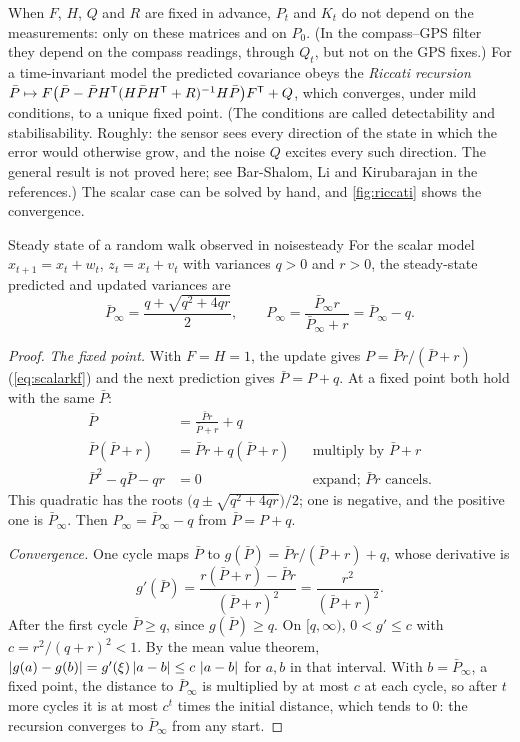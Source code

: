 When $F$, $H$, $Q$ and $R$ are fixed in advance, $P_t$ and $K_t$ do not
depend on the measurements: only on these matrices and on $P_0$. (In the
compass--GPS filter they depend on the compass readings, through $Q_t$,
but not on the GPS fixes.) For a time-invariant model the predicted covariance obeys the
\emph{Riccati recursion} $\bar P\mapsto F\bigl(\bar P-\bar PH^{\mathsf{T}}(H\bar PH^{\mathsf{T}}
+R)^{-1}H\bar P\bigr)F^{\mathsf{T}}+Q$, which converges, under mild conditions, to a
unique fixed point. (The conditions are called detectability and
stabilisability. Roughly: the sensor sees every direction of the state in
which the error would otherwise grow, and the noise $Q$ excites every such
direction. The general result is not proved here; see Bar-Shalom, Li and
Kirubarajan in the references.) The scalar case can be solved by hand, and
\cref{fig:riccati} shows the convergence.

\begin{proposition}{Steady state of a random walk observed in noise}{steady}
For the scalar model $x_{t+1}=x_t+w_t$, $z_t=x_t+v_t$ with variances $q>0$
and $r>0$, the steady-state predicted and updated variances are
\[
  \bar P_\infty=\frac{q+\sqrt{q^2+4qr}}2,\qquad
  P_\infty=\frac{\bar P_\infty r}{\bar P_\infty+r}=\bar P_\infty-q .
\]
\end{proposition}

\begin{proof}
\emph{The fixed point.} With $F=H=1$, the update gives
$P=\bar Pr/(\bar P+r)$ (\cref{eq:scalarkf}) and the next prediction gives
$\bar P=P+q$. At a fixed point both hold with the same $\bar P$:
\begin{align*}
  \bar P&=\frac{\bar Pr}{\bar P+r}+q\\
  \bar P(\bar P+r)&=\bar Pr+q(\bar P+r)
  &&\text{multiply by }\bar P+r\\
  \bar P^2-q\bar P-qr&=0
  &&\text{expand; }\bar Pr\text{ cancels.}
\end{align*}
This quadratic has the roots $\bigl(q\pm\sqrt{q^2+4qr}\bigr)/2$; one is
negative, and the positive one is $\bar P_\infty$. Then
$P_\infty=\bar P_\infty-q$ from $\bar P=P+q$.

\emph{Convergence.} One cycle maps $\bar P$ to
$g(\bar P)=\bar Pr/(\bar P+r)+q$, whose derivative is
\[
  g'(\bar P)=\frac{r(\bar P+r)-\bar Pr}{(\bar P+r)^2}
  =\frac{r^2}{(\bar P+r)^2}.
\]
After the first cycle $\bar P\ge q$, since $g(\bar P)\ge q$. On
$[q,\infty)$, $0<g'\le c$ with $c=r^2/(q+r)^2<1$. By the mean value
theorem, $\left\lvert g(a)-g(b)\right\rvert=g'(\xi)\left\lvert a-b\right\rvert\le c\,\left\lvert a-b\right\rvert$ for $a,b$ in
that interval. With $b=\bar P_\infty$, a fixed point, the distance to
$\bar P_\infty$ is multiplied by at most $c$ at each cycle, so after $t$
more cycles it is at most $c^t$ times the initial distance, which tends to
$0$: the recursion converges to $\bar P_\infty$ from any start.
\end{proof}

